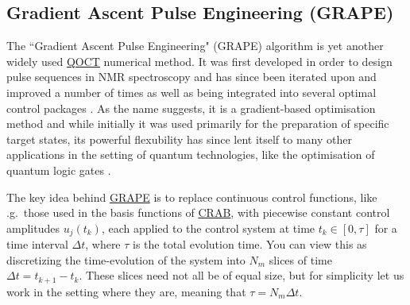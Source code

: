 \documentclass[a4paper,oneside,11pt]{book}
\newcommand{\acrref}[1]{\hyperref[acr:#1]{#1}}
\begin{document}
\subsection{Gradient Ascent Pulse Engineering (GRAPE)}\label{sec:3.3.2_GRAPE}

The ``Gradient Ascent Pulse Engineering" (GRAPE) algorithm is yet another widely used \acrref{QOCT} numerical method. It was first developed in order to design pulse sequences in NMR spectroscopy \cite{khaneja_optimal_2005} and has since been iterated upon and improved a number of times as well as being integrated into several optimal control packages \cite{de_fouquieres_second_2011, chen_iterative_2022, machnes_comparing_2011, johansson_qutip_2013}. As the name suggests, it is a gradient-based optimisation method and while initially it was used primarily for the preparation of specific target states, its powerful flexubility has since lent itself to many other applications in the setting of quantum technologies, like the optimisation of quantum logic gates \cite{motzoi_optimal_2011, anderson_accurate_2015}.

The key idea behind \acrref{GRAPE} is to replace continuous control functions, like \@e.g.~those used in the basis functions of \acrref{CRAB}, with piecewise constant control amplitudes $u_j(t_k)$, each applied to the control system at time $t_k \in [0, \tau]$ for a time interval $\Delta t$, where $\tau$ is the total evolution time. You can view this as discretizing the time-evolution of the system into $N_m$ slices of time $\Delta t = t_{k + 1} - t_k$. These slices need not all be of equal size, but for simplicity let us work in the setting where they are, meaning that $\tau = N_m \Delta t$.
\end{document}
